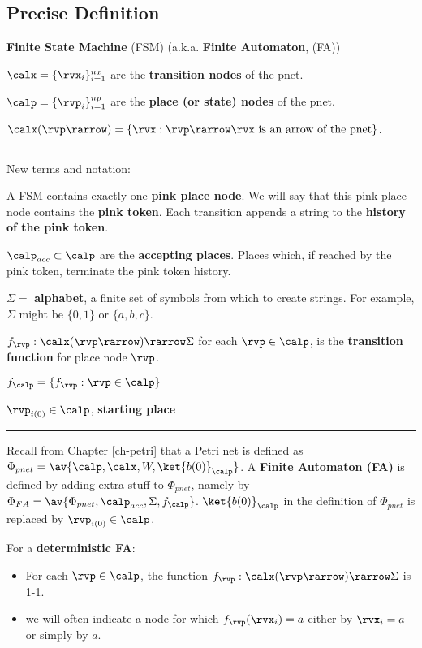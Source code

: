 \subsection{Precise Definition}
{\bf Finite State Machine} (FSM) (a.k.a. {\bf Finite Automaton}, (FA))

$\calx =\{\rvx_i\}_{i=1}^{nx}$ are the {\bf transition nodes} of the pnet.

$\calp =\{\rvp_i\}_{i=1}^{np}$ are the {\bf place (or state) nodes} of the pnet.

$\calx(\rvp\rarrow)=\{\rvx: \rvp\rarrow\rvx \text{ is an arrow of the pnet}\}$.

\hrule
New terms and notation:

A FSM contains exactly one {\bf pink place node}. We will 
say that this pink place node contains the {\bf pink token}.
Each transition appends a string to the {\bf history of the pink token}.

$\calp_{acc}\subset \calp$ are the 
{\bf accepting places}. Places which, if reached by the pink token, terminate the pink token history.

$\Sigma=$ {\bf alphabet}, a finite set of symbols
from which to create strings. For example,
$\Sigma$ might be $\{0, 1\}$ or $\{a, b, c\}$.

$f_\rvp:\calx(\rvp\rarrow)\rarrow \Sigma$ for each
$\rvp\in \calp$,  is the 
{\bf transition function} for place node $\rvp$. 

$f_\calp =
\{f_\rvp: \rvp\in \calp\}$

$\rvp_{i(0)}\in \calp$, {\bf starting place }
\hrule
Recall from Chapter \ref{ch-petri} that a Petri net is defined as $\Phi_{pnet} = \av{\calp, \calx, W,\ket{b(0)}_\calp}$.
A {\bf Finite Automaton (FA)}
is defined by adding extra stuff to
$\Phi_{pnet}$, namely by
$\Phi_{FA}=\av{\Phi_{pnet},\calp_{acc}, \Sigma, f_\calp}$.
$\ket{b(0)}_\calp$ in the definition
of $\Phi_{pnet}$ is replaced by
$\rvp_{i(0)}\in\calp$.

\begin{mdframed}[hidealllines=true,backgroundcolor=blue!10]
For a {\bf deterministic FA}:
\begin{itemize}
\item For each $\rvp\in\calp$, the function $f_\rvp:\calx(\rvp\rarrow)\rarrow \Sigma$ is 1-1.

\item
we will often indicate a node for 
which $f_{\rvp}(\rvx_i)=a$ either by $\rvx_i=a$
or simply by $a$. 
\end{itemize}\end{mdframed}

